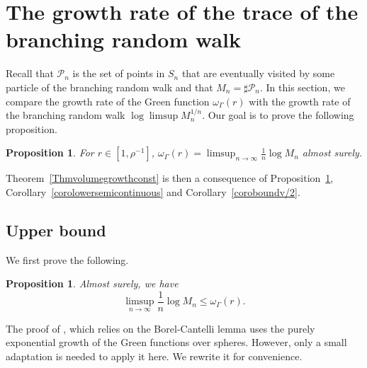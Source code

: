 \documentclass{amsart}
\newtheorem{prop}[thm]{Proposition}
\theoremstyle{definition}
\theoremstyle{remark}
\begin{document}





\section{The growth rate of the trace of the branching random walk}\label{SectiongrowthrateBRW}
\label{s:vgrbrw}


Recall that $\mathcal{P}_n$ is the set of points in $S_n$ that are eventually visited by some particle of the branching random walk and that $M_n=\sharp \mathcal{P}_n$.
In this section, we compare the growth rate of the Green function $\omega_\Gamma(r)$ with the growth rate of the branching random walk $\log \limsup M_n^{1/n}$.
Our goal is to prove the following proposition.
\begin{prop}\label{P:vgrBRW}
For $r\in [1, \rho^{-1}]$, $\omega_{\Gamma}(r) = \limsup_{n \to \infty} \frac{1}{n} \log M_n$ almost surely.
\end{prop}

Theorem~\ref{Thmvolumegrowthconst} is then a consequence of Proposition~\ref{P:vgrBRW}, Corollary~\ref{corolowersemicontinuous} and Corollary~\ref{coroboundv/2}.

\subsection{Upper bound}
We first prove the following.



\begin{prop}\label{upperboundvgrBRW}
Almost surely, we have
$$\limsup_{n \to \infty} \frac{1}{n} \log M_n \leq \omega_\Gamma(r).$$
\end{prop}


The proof of \cite{SWX}, which relies on the Borel-Cantelli lemma uses the purely exponential growth of  the Green functions over spheres.
However, only a small adaptation is needed to apply it here.
We rewrite it for convenience.
\end{document}
